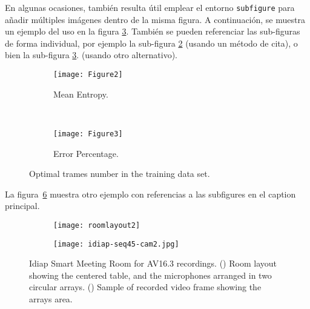 En algunas ocasiones, también resulta útil emplear el entorno
\texttt{subfigure} para añadir múltiples imágenes dentro de la misma
figura. A continuación, se muestra un ejemplo del uso en la figura
\ref{fig:fig3}. También se pueden referenciar las sub-figuras de forma
individual, por ejemplo la sub-figura \ref{fig:fig3b} (usando un método
de cita), o bien la sub-figura \ref{fig:fig3}. (usando
otro alternativo).

\begin{figure}
  \centering
  \begin{subfigure}[b]{0.3\textwidth}
    \texttt{[image: Figure2]}
    \caption{Mean Entropy.}
    \label{fig:fig3a}
  \end{subfigure}%
  ~ %
  \begin{subfigure}[b]{0.3\textwidth}
    \texttt{[image: Figure3]}
    \caption{Error Percentage.}
    \label{fig:fig3b}
  \end{subfigure}
  \caption{Optimal trames number in the training data set.}
  \label{fig:fig3}
\end{figure}

La figura~\ref{fig:LIdiapRoom} muestra otro ejemplo con referencias a
las subfigures en el caption principal. 

\begin{figure}
  \centering
  \begin{subfigure}[b]{0.30\textwidth}
    \texttt{[image: roomlayout2]}
    \caption{}
    \label{fig:RoomLayout}
  \end{subfigure}%
  \qquad \qquad %
  \begin{subfigure}[b]{0.425\textwidth}
    \texttt{[image: idiap-seq45-cam2.jpg]}
    \caption{}
    \label{fig:RoomPicture}
  \end{subfigure}
  \caption{Idiap Smart Meeting Room for AV16.3 recordings.
    (\protect{}) Room layout showing the centered
    table, and the microphones arranged in two circular arrays.
    (\protect{}) Sample of recorded video frame
    showing the arrays area. \vspace{-0.3cm}}
  \label{fig:LIdiapRoom}
\end{figure}

